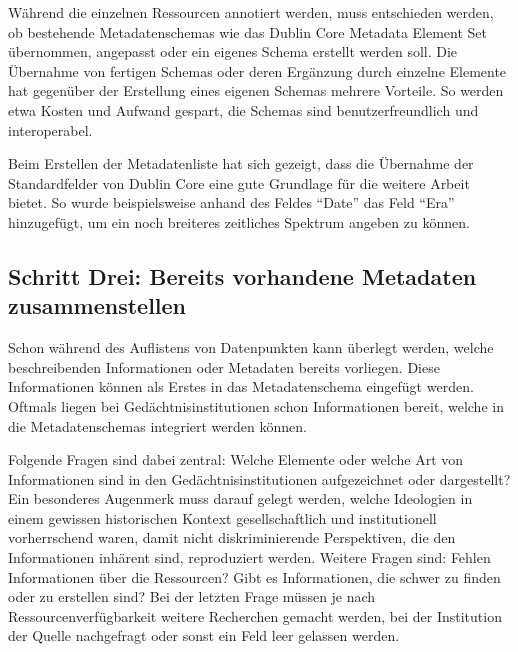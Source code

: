 \documentclass[
  letterpaper,
  DIV=11,
  numbers=noendperiod,
  landscape,
  a4paper,
  geometry:margin=1in]{scrartcl}
\begin{document}
Während die einzelnen Ressourcen annotiert werden, muss entschieden
werden, ob bestehende Metadatenschemas wie das Dublin Core Metadata
Element Set übernommen, angepasst oder ein eigenes Schema erstellt
werden soll. Die Übernahme von fertigen Schemas oder deren Ergänzung
durch einzelne Elemente hat gegenüber der Erstellung eines eigenen
Schemas mehrere Vorteile. So werden etwa Kosten und Aufwand gespart, die
Schemas sind benutzerfreundlich und interoperabel.

\begin{tcolorbox}[enhanced jigsaw, colframe=quarto-callout-tip-color-frame, bottomtitle=1mm, coltitle=black, opacitybacktitle=0.6, toprule=.15mm, opacityback=0, arc=.35mm, toptitle=1mm, title=\textcolor{quarto-callout-tip-color}{\faLightbulb}\hspace{0.5em}{Erfahrungen der Stadt.Geschichte.Basel}, colbacktitle=quarto-callout-tip-color!10!white, colback=white, bottomrule=.15mm, breakable, titlerule=0mm, rightrule=.15mm, leftrule=.75mm, left=2mm]

Beim Erstellen der Metadatenliste hat sich gezeigt, dass die Übernahme
der Standardfelder von Dublin Core eine gute Grundlage für die weitere
Arbeit bietet. So wurde beispielsweise anhand des Feldes ``Date'' das
Feld ``Era'' hinzugefügt, um ein noch breiteres zeitliches Spektrum
angeben zu können.

\end{tcolorbox}

\subsection{Schritt Drei: Bereits vorhandene Metadaten
zusammenstellen}\label{schritt-drei-bereits-vorhandene-metadaten-zusammenstellen}

Schon während des Auflistens von Datenpunkten kann überlegt werden,
welche beschreibenden Informationen oder Metadaten bereits vorliegen.
Diese Informationen können als Erstes in das Metadatenschema eingefügt
werden. Oftmals liegen bei Gedächtnisinstitutionen schon Informationen
bereit, welche in die Metadatenschemas integriert werden können.

Folgende Fragen sind dabei zentral: Welche Elemente oder welche Art von
Informationen sind in den Gedächtnisinstitutionen aufgezeichnet oder
dargestellt? Ein besonderes Augenmerk muss darauf gelegt werden, welche
Ideologien in einem gewissen historischen Kontext gesellschaftlich und
institutionell vorherrschend waren, damit nicht diskriminierende
Perspektiven, die den Informationen inhärent sind, reproduziert werden.
Weitere Fragen sind: Fehlen Informationen über die Ressourcen? Gibt es
Informationen, die schwer zu finden oder zu erstellen sind? Bei der
letzten Frage müssen je nach Ressourcenverfügbarkeit weitere Recherchen
gemacht werden, bei der Institution der Quelle nachgefragt oder sonst
ein Feld leer gelassen werden.
\end{document}
